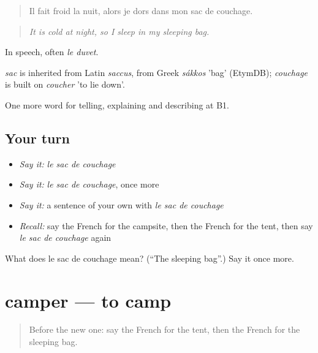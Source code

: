 \begin{quote}
Il fait froid la nuit, alors je dors dans mon sac de couchage.
\end{quote}

\begin{quote}
\emph{It is cold at night, so I sleep in my sleeping bag.}
\end{quote}

In speech, often \emph{le duvet}.

\begin{cousinweb}
\emph{sac} is inherited from Latin \emph{saccus}, from Greek \emph{sákkos} 'bag' (EtymDB); \emph{couchage} is built on \emph{coucher} 'to lie down'.
\end{cousinweb}

\begin{grammarlens}[title={What you've built}]
One more word for telling, explaining and describing at B1.
\end{grammarlens}

\subsection*{Your turn}
\begin{itemize}
\raggedright
  \item \emph{Say it:} \emph{le sac de couchage}
  \item \emph{Say it:} \emph{le sac de couchage}, once more
  \item \emph{Say it:} a sentence of your own with \emph{le sac de couchage}
  \item \emph{Recall:} say the French for the campsite, then the French for the tent, then say \emph{le sac de couchage} again
\end{itemize}

\begin{tcolorbox}[breakable,colback=teal!4,colframe=teal!35!black,title={Before you move on}]
What does le sac de couchage mean? (\textquotedblleft{}The sleeping bag\textquotedblright{}.) Say it once more.
\end{tcolorbox}
\section[camper]{camper — to camp}

\label{lesson:FR-C425-camper}



\begin{quote}
Before the new one: say the French for the tent, then the French for the sleeping bag.
\end{quote}

